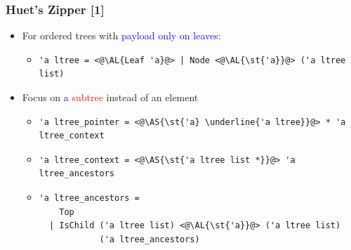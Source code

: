 \begin{frame}[fragile]
\frametitle{Huet's Zipper [1]}

\newcommand{\AS}[1]{\textcolor{red}{#1}}
\newcommand{\AL}[1]{\textcolor{blue}{#1}}

\begin{itemize}[<+->]
\item For ordered trees with \AL{payload only on leaves}:

\begin{itemize}
\item
\begin{lstlisting}
'a ltree = <@\AL{Leaf 'a}@> | Node <@\AL{\st{'a}}@> ('a ltree list)
\end{lstlisting}
\end{itemize}

\item Focus on a \AS{subtree} instead of an element

\begin{itemize}
\item
\begin{lstlisting}
'a ltree_pointer = <@\AS{\st{'a} \underline{'a ltree}}@> * 'a ltree_context
\end{lstlisting}

\item 
\begin{lstlisting}
'a ltree_context = <@\AS{\st{'a ltree list *}}@> 'a ltree_ancestors
\end{lstlisting}

\item 
\begin{lstlisting}
'a ltree_ancestors =
    Top
  | IsChild ('a ltree list) <@\AL{\st{'a}}@> ('a ltree list)
            ('a ltree_ancestors)
\end{lstlisting}

\end{itemize} 

\end{itemize}
\end{frame}

